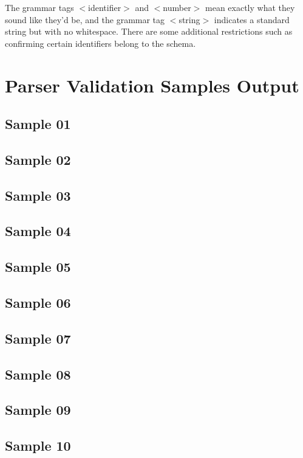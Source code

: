 \documentclass[]{article}
\begin{document}
	The grammar tags $<$identifier$>$ and $<$number$>$ mean exactly what they sound like they'd be, and the grammar tag $<$string$>$ indicates a standard string but with no whitespace. There are some additional restrictions such as confirming certain identifiers belong to the schema.
	
	\section{Parser Validation Samples Output}
		\subsection{Sample 01}  \pagebreak
		\subsection{Sample 02}  \pagebreak
		\subsection{Sample 03}  \pagebreak
		\subsection{Sample 04}  \pagebreak
		\subsection{Sample 05}  \pagebreak
		\subsection{Sample 06}  \pagebreak
		\subsection{Sample 07}  \pagebreak
		\subsection{Sample 08}  
		\subsection{Sample 09}  \pagebreak
		\subsection{Sample 10}  
\end{document}
